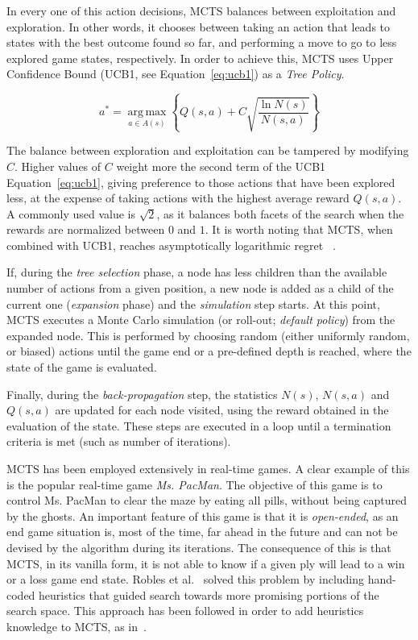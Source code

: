 \documentclass[journal]{IEEEtran}
\newcommand{\argmax}{\operatorname*{arg\,max}}
\begin{document}
In every one of this action decisions, MCTS balances between exploitation and exploration. In other words, it chooses between taking an action that leads to states with the best outcome found so far, and performing a move to go to less explored game states, respectively. In order to achieve this, MCTS uses Upper Confidence Bound (UCB1, see Equation~\ref{eq:ucb1}) as a \textit{Tree Policy}. 

\begin{equation}	\label{eq:ucb1}
a^* = \argmax_{a \in A(s)} \left\{Q(s,a) + C \sqrt{\frac{ \ln N(s) }{ N(s,a) }}\right\}
\end{equation}

The balance between exploration and exploitation can be tampered by modifying $C$. Higher values of $C$ weight more the second term of the UCB1 Equation~\ref{eq:ucb1}, giving preference to those actions that have been explored less, at the expense of taking actions with the highest average reward $Q(s,a)$. A commonly used value is $\sqrt{2}$, as it balances both facets of the search when the rewards are normalized between $0$ and $1$. It is worth noting that MCTS, when combined with UCB1, reaches asymptotically logarithmic regret~\cite{coquelin2007bandit} . 

If, during the \textit{tree selection} phase, a node has less children than the available number of actions from a given position, a new node is added as a child of the current one (\textit{expansion} phase) and the \textit{simulation} step starts. At this point, MCTS executes a Monte Carlo simulation (or roll-out; \textit{default policy}) from the expanded node. This is performed by choosing random (either uniformly random, or biased) actions until the game end or a pre-defined depth is reached, where the state of the game is evaluated. 

Finally, during the \textit{back-propagation} step, the statistics $N(s)$, $N(s,a)$ and $Q(s,a)$ are updated for each node visited, using the reward obtained in the evaluation of the state. These steps are executed in a loop until a termination criteria is met (such as number of iterations).


MCTS has been employed extensively in real-time games. A clear example of this is the popular real-time game \textit{Ms. PacMan}. The objective of this game is to control Ms. PacMan to clear the maze by eating all pills, without being captured by the ghosts. An important feature of this game is that it is \textit{open-ended}, as an end game situation is, most of the time, far ahead in the future and can not be devised by the algorithm during its iterations. The consequence of this is that MCTS, in its vanilla form, it is not able to know if a given ply will lead to a win or a loss game end state. Robles et al.~\cite{Robles2009} solved this problem by including hand-coded heuristics that guided search towards more promising portions of the search space. This approach has been followed in order to add heuristics knowledge to MCTS, as in~\cite{Samothrakis, Ikehata2010}.
\end{document}

